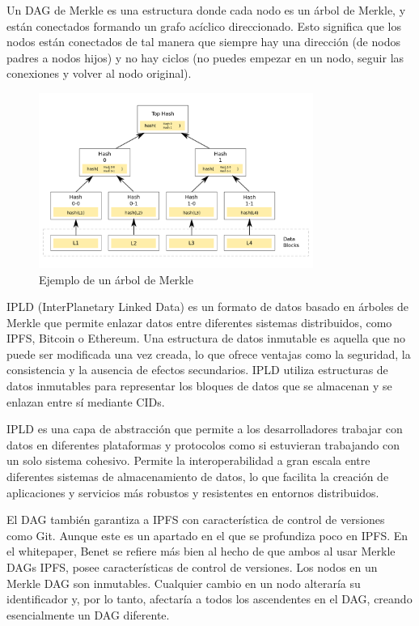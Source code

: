 Un DAG de Merkle es una estructura donde cada nodo es un árbol de Merkle, y están conectados formando un grafo acíclico direccionado.
Esto significa que los nodos están conectados de tal manera que siempre hay una dirección (de nodos padres a nodos hijos) y no hay ciclos (no puedes empezar en un nodo, seguir las conexiones y volver al nodo original).

\begin{figure}[H]
      \centering
      \includegraphics[width=0.8\textwidth]{images/merkledag.png}
      \caption{Ejemplo de un árbol de Merkle}
      \label{merkledag}
\end{figure}

IPLD (InterPlanetary Linked Data)\cite{IPLDDocs} es un formato de datos basado en árboles de Merkle que permite enlazar datos entre diferentes sistemas distribuidos, como IPFS,
Bitcoin o Ethereum. Una estructura de datos inmutable es aquella que no puede ser modificada una vez creada, lo que ofrece ventajas como la seguridad, la
consistencia y la ausencia de efectos secundarios. IPLD utiliza estructuras de datos inmutables para representar los bloques de datos que se almacenan y se
enlazan entre sí mediante CIDs.

IPLD es una capa de abstracción que permite a los desarrolladores trabajar con datos en diferentes plataformas y protocolos como si estuvieran trabajando con un solo sistema cohesivo. Permite la interoperabilidad a gran escala entre diferentes sistemas de almacenamiento de datos, lo que facilita la creación de aplicaciones y servicios más robustos y resistentes en entornos distribuidos.

El DAG también garantiza a IPFS con característica de control de versiones como Git. Aunque este es un apartado en el que se profundiza poco en IPFS.
En el whitepaper, Benet se refiere más bien al hecho de que ambos al usar Merkle DAGs IPFS, posee características de control de versiones. Los nodos en un Merkle DAG son inmutables. Cualquier cambio en un nodo alteraría su identificador y, por lo tanto, afectaría a todos los ascendentes en el DAG, creando esencialmente un DAG diferente.

